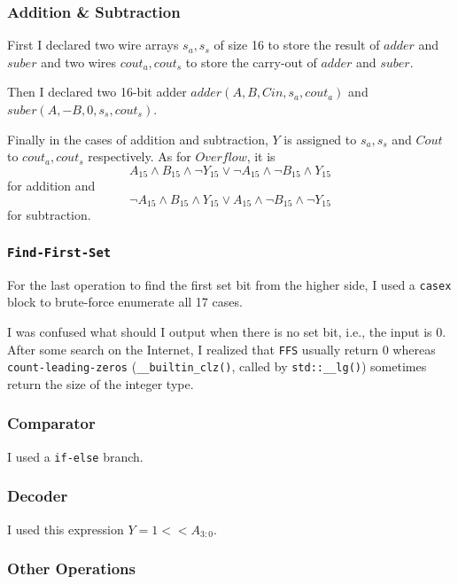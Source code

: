 \documentclass[12pt, a4paper]{article}
\begin{document}
\subsubsection{Addition \& Subtraction}

First I declared two wire arrays $s_a,s_s$ of size 16 to store the result of $adder$ and $suber$ and two wires $cout_a,cout_s$ to store the carry-out of $adder$ and $suber$.

Then I declared two 16-bit \textsf{adder} $adder(A,B,Cin,s_a,cout_a)$ and\linebreak$suber(A,-B,0,s_s,cout_s)$.

Finally in the cases of addition and subtraction, $Y$ is assigned to $s_a,s_s$ and $Cout$ to $cout_a,cout_s$ respectively. As for $Overflow$, it is $$A_{15}\land B_{15}\land\lnot Y_{15}\lor\lnot A_{15}\land\lnot B_{15}\land Y_{15}$$ for addition and $$\lnot A_{15}\land B_{15}\land Y_{15}\lor A_{15}\land\lnot B_{15}\land\lnot Y_{15}$$ for subtraction.

\subsubsection{\texttt{Find-First-Set}}

For the last operation to find the first set bit from the higher side, I used a \texttt{casex} block to brute-force enumerate all 17 cases.

I was confused what should I output when there is no set bit, i.e., the input is 0. After some search on the Internet, I realized that \texttt{FFS} usually return 0 whereas \texttt{count-leading-zeros} (\texttt{\_\_builtin\_clz()}, called by \texttt{std::\_\_lg()}) sometimes return the size of the integer type.

\subsubsection{Comparator}

I used a \texttt{if-else} branch.

\subsubsection{Decoder}

I used this expression $Y = 1 << A_{3:0}$.

\subsubsection{Other Operations}
\end{document}

